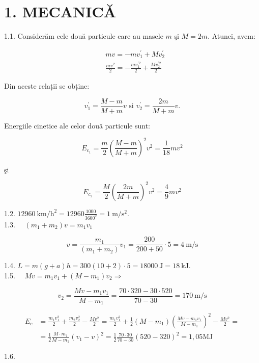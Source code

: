 
\section*{1. MECANICĂ}
1.1. Considerăm cele două particule care au masele $m$ şi $M=2 m$. Atunci, avem:

$$
\begin{aligned}
& m v=-m v_{1}^{\prime}+M v_{2}^{\prime} \\
& \frac{m v^{2}}{2}=-\frac{m v_{1}^{\prime 2}}{2}+\frac{M v_{2}^{\prime 2}}{2}
\end{aligned}
$$

Din aceste relații se obține:

$$
v_{1}^{\prime}=\frac{M-m}{M+m} v \text { si } v_{2}^{\prime}=\frac{2 m}{M+m} v .
$$

Energiile cinetice ale celor două particule sunt:

$$
E_{c_{1}}=\frac{m}{2}\left(\frac{M-m}{M+m}\right)^{2} v^{2}=\frac{1}{18} m v^{2}
$$

şi

$$
E_{c_{2}}=\frac{M}{2}\left(\frac{2 m}{M+m}\right)^{2} v^{2}=\frac{4}{9} m v^{2}
$$

1.2. $12960 \mathrm{~km} / \mathrm{h}^{2}=12960 \frac{1000}{3600^{2}}=1 \mathrm{~m} / \mathrm{s}^{2}$.\\
1.3. $\quad\left(m_{1}+m_{2}\right) v=m_{1} v_{1}$

$$
v=\frac{m_{1}}{\left(m_{1}+m_{2}\right)} v_{1}=\frac{200}{200+50} \cdot 5=4 \mathrm{~m} / \mathrm{s}
$$

1.4. $L=m(g+a) h=300(10+2) \cdot 5=18000 \mathrm{~J}=18 \mathrm{~kJ}$.\\
1.5. $\quad M v=m_{1} v_{1}+\left(M-m_{1}\right) v_{2} \Rightarrow$

$$
v_{2}=\frac{M v-m_{1} v_{1}}{M-m_{1}}=\frac{70 \cdot 320-30 \cdot 520}{70-30}=170 \mathrm{~m} / \mathrm{s}
$$

$$
\begin{aligned}
E_{c} & =\frac{m_{1} v_{1}^{2}}{2}+\frac{m_{2} v_{2}^{2}}{2}-\frac{M v^{2}}{2}=\frac{m_{1} v_{1}^{2}}{2}+\frac{1}{2}\left(M-m_{1}\right)\left(\frac{M v-m_{1} v_{1}}{M-m_{1}}\right)^{2}-\frac{M v^{2}}{2}= \\
& =\frac{1}{2} \frac{M \cdot m_{1}}{M-m_{1}}\left(v_{1}-v\right)^{2}=\frac{1}{2} \frac{70 \cdot 30}{70-30}(520-320)^{2}=1,05 \mathrm{MJ}
\end{aligned}
$$

1.6.

